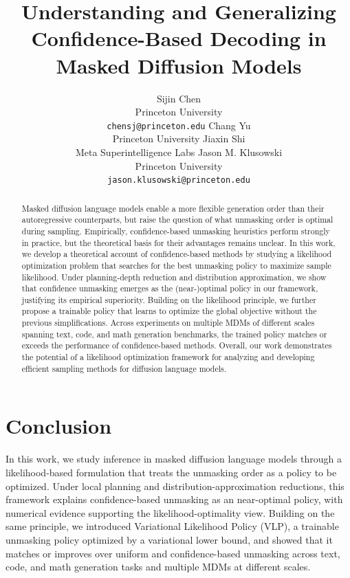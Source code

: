 \documentclass{article}
\title{Understanding and Generalizing Confidence-Based Decoding in Masked Diffusion Models}
\author{%
  Sijin Chen \\
  Princeton University \\
  \texttt{chensj@princeton.edu}
  \And
  Chang Yu \\
  Princeton University
  \And
  Jiaxin Shi \\
  Meta Superintelligence Labs
  \And
  Jason M. Klusowski \\
  Princeton University \\
  \texttt{jason.klusowski@princeton.edu}
}
\theoremstyle{plain}
\theoremstyle{definition}
\theoremstyle{remark}
\newcommand{\alg}{VLP}
\begin{document}
\maketitle

\begin{abstract}
Masked diffusion language models enable a more flexible generation order than their autoregressive counterparts, but raise the question of what unmasking order is optimal during sampling. Empirically, confidence-based unmasking heuristics perform strongly in practice, but the theoretical basis for their advantages remains unclear. In this work, we develop a theoretical account of confidence-based methods by studying a likelihood optimization problem that searches for the best unmasking policy to maximize sample likelihood. Under planning-depth reduction and distribution approximation, we show that confidence unmasking emerges as the (near-)optimal policy in our framework, justifying its empirical superiority. Building on the likelihood principle, we further propose a trainable policy that learns to optimize the global objective without the previous simplifications. Across experiments on multiple MDMs of different scales spanning text, code, and math generation benchmarks, the trained policy matches or exceeds the performance of confidence-based methods. Overall, our work demonstrates the potential of a likelihood optimization framework for analyzing and developing efficient sampling methods for diffusion language models.
\end{abstract}







\section{Conclusion}
In this work, we study inference in masked diffusion language models through a likelihood-based formulation that treats the unmasking order as a policy to be optimized. Under local planning and distribution-approximation reductions, this framework explains confidence-based unmasking as an near-optimal policy, with numerical evidence supporting the likelihood-optimality view. Building on the same principle, we introduced Variational Likelihood Policy (\alg{}), a trainable unmasking policy optimized by a variational lower bound, and showed that it matches or improves over uniform and confidence-based unmasking across text, code, and math generation tasks and multiple MDMs at different scales.
\end{document}
